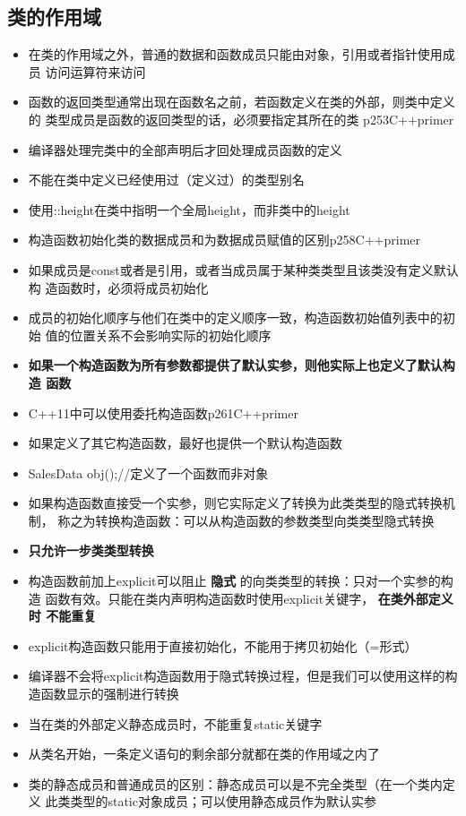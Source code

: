 \documentclass[11pt]{article}
\begin{document}
\subsection{类的作用域}
\label{sec-5-3}
\begin{itemize}
\item 在类的作用域之外，普通的数据和函数成员只能由对象，引用或者指针使用成员
访问运算符来访问
\item 函数的返回类型通常出现在函数名之前，若函数定义在类的外部，则类中定义的
类型成员是函数的返回类型的话，必须要指定其所在的类 p253C++primer
\item 编译器处理完类中的全部声明后才回处理成员函数的定义
\item 不能在类中定义已经使用过（定义过）的类型别名
\item 使用::height在类中指明一个全局height，而非类中的height
\item 构造函数初始化类的数据成员和为数据成员赋值的区别p258C++primer
\item 如果成员是const或者是引用，或者当成员属于某种类类型且该类没有定义默认构
造函数时，必须将成员初始化
\item 成员的初始化顺序与他们在类中的定义顺序一致，构造函数初始值列表中的初始
值的位置关系不会影响实际的初始化顺序
\item \textbf{如果一个构造函数为所有参数都提供了默认实参，则他实际上也定义了默认构造
函数}
\item C++11中可以使用委托构造函数p261C++primer
\item 如果定义了其它构造函数，最好也提供一个默认构造函数
\item SalesData obj();//定义了一个函数而非对象
\item 如果构造函数直接受一个实参，则它实际定义了转换为此类类型的隐式转换机制，
称之为转换构造函数：可以从构造函数的参数类型向类类型隐式转换
\item \textbf{只允许一步类类型转换}
\item 构造函数前加上explicit可以阻止 \textbf{隐式} 的向类类型的转换：只对一个实参的构造
函数有效。只能在类内声明构造函数时使用explicit关键字， \textbf{在类外部定义时
不能重复}
\item explicit构造函数只能用于直接初始化，不能用于拷贝初始化（=形式）
\item 编译器不会将explicit构造函数用于隐式转换过程，但是我们可以使用这样的构
造函数显示的强制进行转换
\item 当在类的外部定义静态成员时，不能重复static关键字
\item 从类名开始，一条定义语句的剩余部分就都在类的作用域之内了
\item 类的静态成员和普通成员的区别：静态成员可以是不完全类型（在一个类内定义
此类类型的static对象成员；可以使用静态成员作为默认实参
\end{itemize}
\end{document}
